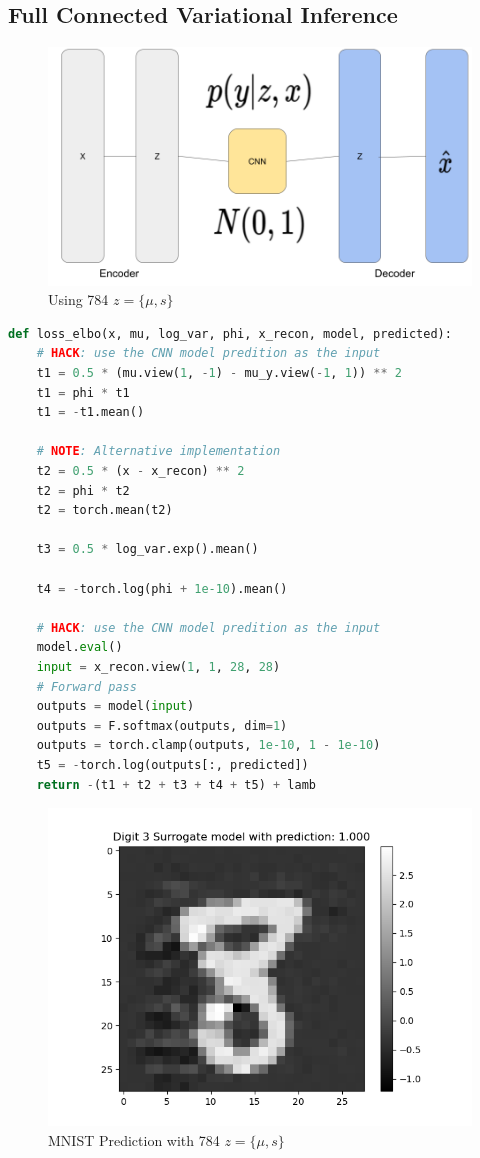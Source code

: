 \documentclass[12pt]{article}
\begin{document}
\subsection{Full Connected Variational Inference}

\begin{figure}[H]
    \centering
    \includegraphics[width=0.5\linewidth]{../fig/Full connected Variational Inference.png} %
    \caption{Using 784 $z=\{ \mu,s \}$ }
    \label{fig:full_connected}
\end{figure}


  \begin{lstlisting}[language=Python, caption= Full connected VI loss function]
def loss_elbo(x, mu, log_var, phi, x_recon, model, predicted):
    # HACK: use the CNN model predition as the input
    t1 = 0.5 * (mu.view(1, -1) - mu_y.view(-1, 1)) ** 2
    t1 = phi * t1
    t1 = -t1.mean()

    # NOTE: Alternative implementation
    t2 = 0.5 * (x - x_recon) ** 2
    t2 = phi * t2
    t2 = torch.mean(t2)

    t3 = 0.5 * log_var.exp().mean()

    t4 = -torch.log(phi + 1e-10).mean()

    # HACK: use the CNN model predition as the input
    model.eval()
    input = x_recon.view(1, 1, 28, 28)
    # Forward pass
    outputs = model(input)
    outputs = F.softmax(outputs, dim=1)
    outputs = torch.clamp(outputs, 1e-10, 1 - 1e-10)
    t5 = -torch.log(outputs[:, predicted])
    return -(t1 + t2 + t3 + t4 + t5) + lamb
\end{lstlisting}

\begin{figure}[H]
    \centering
    \includegraphics[width=0.7\linewidth]{../fig/ID 3-Digit 8 pred 3 new_image.png} %
    \caption{MNIST Prediction with 784 $z=\{\mu,s \}$ }
    \label{fig:naive_bayes}
\end{figure}
\end{document}

